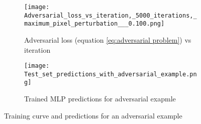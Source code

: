 \begin{figure}
    \centering
    \begin{subfigure}{0.6\textwidth}
        \centering
        \texttt{[image: Adversarial\_loss\_vs\_iteration,\_5000\_iterations,\_maximum\_pixel\_perturbation\_\_\_0.100.png]}
        \caption{Adversarial loss (equation \ref{eq:adversarial problem}) vs iteration}
        \label{fig:adversarial loss}
    \end{subfigure}
    \newline
    \begin{subfigure}{\textwidth}
        \centering
        \texttt{[image: Test\_set\_predictions\_with\_adversarial\_example.png]}
        \caption{Trained MLP predictions for adversarial exapmle}
        \label{fig:adversarial prediction}
    \end{subfigure}
    \caption{Training curve and predictions for an adversarial example}
    \label{fig:adversarial example}
\end{figure}
